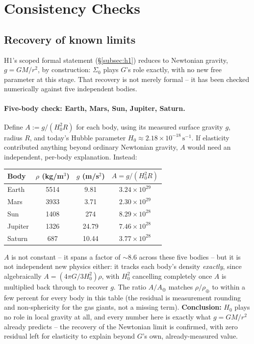 \documentclass[12pt, a4paper]{article}
\begin{document}
\section{Consistency Checks}
\label{sec:consistency}

\subsection{Recovery of known limits}
H1's scoped formal statement (\S\ref{subsec:h1}) reduces to Newtonian
gravity, $g=GM/r^2$, by construction: $\Sigma_0$ plays $G$'s role
exactly, with no new free parameter at this stage. That recovery is
not merely formal -- it has been checked numerically against five
independent bodies.

\paragraph{Five-body check: Earth, Mars, Sun, Jupiter, Saturn.} Define
$A := g/(H_0^2 R)$ for each body, using its measured surface gravity
$g$, radius $R$, and today's Hubble parameter $H_0\approx
2.18\times10^{-18}\,\mathrm{s^{-1}}$. If elasticity contributed
anything beyond ordinary Newtonian gravity, $A$ would need an
independent, per-body explanation. Instead:
\begin{center}
\small
\begin{tabular}{@{}lccc@{}}
\hline
Body & $\rho$ (kg/m$^3$) & $g$ (m/s$^2$) & $A=g/(H_0^2R)$ \\ \hline
Earth & 5514 & 9.81 & $3.24\times10^{29}$ \\
Mars & 3933 & 3.71 & $2.30\times10^{29}$ \\
Sun & 1408 & 274 & $8.29\times10^{28}$ \\
Jupiter & 1326 & 24.79 & $7.46\times10^{28}$ \\
Saturn & 687 & 10.44 & $3.77\times10^{28}$ \\ \hline
\end{tabular}
\end{center}
$A$ is not constant -- it spans a factor of $\sim$8.6 across these
five bodies -- but it is not independent new physics either: it
tracks each body's density \emph{exactly}, since algebraically
$A=(4\pi G/3H_0^2)\rho$, with $H_0^2$ cancelling completely once $A$
is multiplied back through to recover $g$. The ratio $A/A_\oplus$
matches $\rho/\rho_\oplus$ to within a few percent for every body in
this table (the residual is measurement rounding and non-sphericity
for the gas giants, not a missing term). \textbf{Conclusion:} $H_0$
plays no role in local gravity at all, and every number here is
exactly what $g=GM/r^2$ already predicts -- the recovery of the
Newtonian limit is confirmed, with zero residual left for elasticity
to explain beyond $G$'s own, already-measured value.
\end{document}
